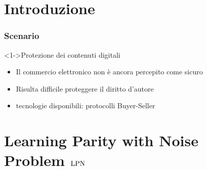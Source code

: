 \section{Introduzione}
\begin{frame}
 \frametitle{Scenario}
   \begin{block}<1->{Protezione dei contenuti digitali}
    \begin{itemize}
     \item Il commercio elettronico non è ancora percepito come sicuro
     \item Risulta difficile proteggere il diritto d'autore
     \item tecnologie disponibili: protocolli Buyer-Seller
    \end{itemize}
   \end{block}
\end{frame}

\section{Learning Parity with Noise Problem $\mathrm{LPN}$}

